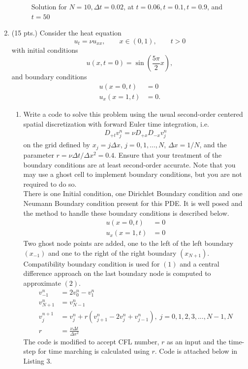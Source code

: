\documentclass[11pt]{article}
\newcommand{\Dpt}{D_{+t}}
\newcommand{\Dpx}{D_{+x}}
\newcommand{\Dmx}{D_{-x}}
\newcommand{\vnpj}{v^{n+1}_j}
\newcommand{\vnjp}{v^n_{j+1}}
\newcommand{\vnjm}{v^n_{j-1}}
\begin{document}
\begin{enumerate}
\begin{figure}[htp]
\begin{tabular}{cc}
\end{tabular}
\caption{Solution for $N=10, \Delta t = 0.02$, at $t=0.06, t=0.1, t=0.9$, and $t=50$}
\label{fig:q2}
\end{figure}
  \item (15 pts.)
  {\color{red}Consider the heat equation}
  \[
    u_t=\nu u_{xx}, \qquad x\in(0,1), \qquad t >0
  \]
  {\color{red}with initial conditions }
  \[
    u(x,t=0)=\sin\left(\frac{5\pi}{2}x\right),
  \] 
  {\color{red}and boundary conditions }
  \begin{align*}
    u(x=0,t) & = 0\\
    u_x(x=1,t) & = 0.
  \end{align*}
  \begin{enumerate}
    \item {\color{blue}Write a code to solve this problem using the usual second-order centered spatial discretization with forward Euler time integration, i.e.}
  \begin{align*}
    \Dpt v_j^n = \nu\Dpx\Dmx v_j^n
  \end{align*}
  {\color{blue}on the grid defined by} $x_j=j\Delta x$, $j=0,1,\ldots,N$, $\Delta x=1/N$, {\color{blue}and the parameter }$r=\nu\Delta t/\Delta x^2=0.4$. {\color{blue}Ensure that your treatment of the boundary conditions are at least second-order accurate. Note that you may use a ghost cell to implement boundary conditions, but you are not required to do so. }\\
  
There is one Initial condition, one Dirichlet Boundary condition and one Neumann Boundary condition present for this PDE. It is well posed and the method to handle these boundary conditions is described below.
\begin{align}
u(x=0,t) & = 0 \\
u_x(x=1,t) & = 0
\end{align}
Two ghost node points are added, one to the left of the left boundary $(x_{-1})$ and one to the right of the right boundary $(x_{N+1})$.  Compatibility boundary condition is used for $(1)$ and a central difference approach on the last boundary node is computed to approximate $(2)$. 
\begin{align*}
v^n_{-1} & = 2v^n_0 - v^n_1 \\
v^n_{N+1} & = v^n_{N-1} \\
\vnpj & = v^n_j + r\left(\vnjp - 2v^n_j + \vnjm\right), \; j = 0,1,2,3,...,N-1,N \\
r & = \frac{\nu \Delta t}{\Delta x^2}
\end{align*}
The code is modified to accept CFL number, $r$ as an input and the time-step for time marching is calculated using $r$. Code is attached below in Listing 3. \\
 


\end{enumerate}
\end{enumerate}
\end{document}
